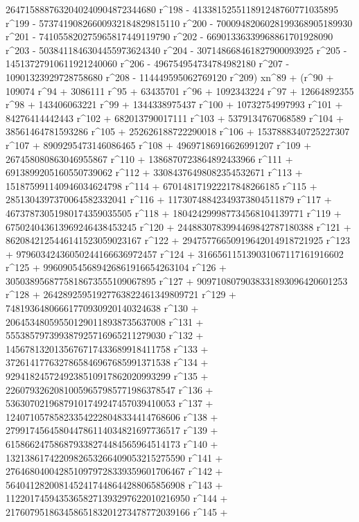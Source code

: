        2647158887632040240904872344680 r^198 - 
       413381525511891248760771035895 r^199 - 
       57374190826600932184829815110 r^200 - 
       7000948206028199368905189930 r^201 - 
       741055820275965817449119790 r^202 - 
       66901336339968861701928090 r^203 - 
       5038411846304455973624340 r^204 - 
       307148668461827900093925 r^205 - 
       14513727910611921240060 r^206 - 496754954734784982180 r^207 - 
       10901323929728758680 r^208 - 
       114449595062769120 r^209) xn^89 + (r^90 + 109074 r^94 + 
       3086111 r^95 + 63435701 r^96 + 1092343224 r^97 + 
       12664892355 r^98 + 143406063221 r^99 + 1344338975437 r^100 + 
       10732754997993 r^101 + 84276414442443 r^102 + 
       682013790017111 r^103 + 5379134767068589 r^104 + 
       38561464781593286 r^105 + 252626188722290018 r^106 + 
       1537888340725227307 r^107 + 8909295473146086465 r^108 + 
       49697186916626991207 r^109 + 267458080863046955867 r^110 + 
       1386870723864892433966 r^111 + 6913899205160550739062 r^112 + 
       33084376498082354532671 r^113 + 
       151875991140946034624798 r^114 + 
       670148171922217848266185 r^115 + 
       2851304397370064582332041 r^116 + 
       11730748842349373804511879 r^117 + 
       46737873051980174359035505 r^118 + 
       180424299987734568104139771 r^119 + 
       675024043613969246438453245 r^120 + 
       2448830783994469842787180388 r^121 + 
       8620842125446141523059023167 r^122 + 
       29475776650919642014918721925 r^123 + 
       97960342436050244166636972457 r^124 + 
       316656115139031067117161916602 r^125 + 
       996090545689426861916654263104 r^126 + 
       3050389568775818673555109067895 r^127 + 
       9097108079038331893096420601253 r^128 + 
       26428925951927763822461349809721 r^129 + 
       74819364806661770930920140324638 r^130 + 
       206453480595501290118938735637008 r^131 + 
       555385797399387925716965211279030 r^132 + 
       1456781320135676717433689918411758 r^133 + 
       3726141776327865846967685991371538 r^134 + 
       9294182457249238510917862020993299 r^135 + 
       22607932620810059657985771986378547 r^136 + 
       53630702196879101749247457039410053 r^137 + 
       124071057858233542228048334414768606 r^138 + 
       279917456458044786114034821697736517 r^139 + 
       615866247586879338274484565964514173 r^140 + 
       1321386174220982653266409053215275590 r^141 + 
       2764680400428510979728339359601706467 r^142 + 
       5640412820081452417448644288065856908 r^143 + 
       11220174594353658271393297622010216950 r^144 + 
       21760795186345865183201273478772039166 r^145 + 

